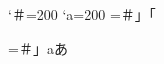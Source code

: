 \postbreakpenalty`＃=200
\postbreakpenalty`a=200
=\hbox{＃」「\showlists}

=\hbox{＃\unpenalty 」a\relax あ\showlists}


\bye
